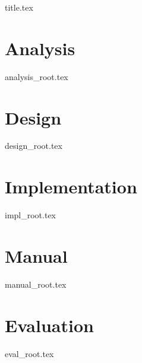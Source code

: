 \documentclass[a4paper, 12pt]{scrartcl}
\begin{document}
{title.tex}

\tableofcontents

\pagebreak

\section{Analysis}
{analysis_root.tex}
\pagebreak

\section{Design}
{design_root.tex}
\pagebreak

\section{Implementation}
{impl_root.tex}
\pagebreak

\section{Manual}
{manual_root.tex}
\pagebreak

\section{Evaluation}
{eval_root.tex}
\pagebreak
\end{document}
